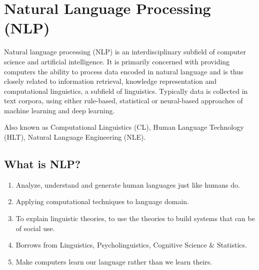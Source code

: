 \chapter{Natural Language Processing (NLP)}\label{chap: nlp}

Natural language processing (NLP) is an interdisciplinary subfield of computer science and artificial intelligence. It is primarily concerned with providing computers the ability to process data encoded in natural language and is thus closely related to information retrieval, knowledge representation and computational linguistics, a subfield of linguistics. Typically data is collected in text corpora, using either rule-based, statistical or neural-based approaches of machine learning and deep learning.\cite{wiki-nlp}

Also known as Computational Linguistics (CL), Human Language Technology (HLT), Natural Language Engineering (NLE).

\section{What is NLP?}
\begin{enumerate}
    \item Analyze, understand and generate human languages just like humans do.
    \item Applying computational techniques to language domain.
    \item To explain linguistic theories, to use the theories to build systems that can be of social use.
    \item Borrows from Linguistics, Psycholinguistics, Cognitive Science \& Statistics.
    \item Make computers learn our language rather than we learn theirs.
\end{enumerate}

